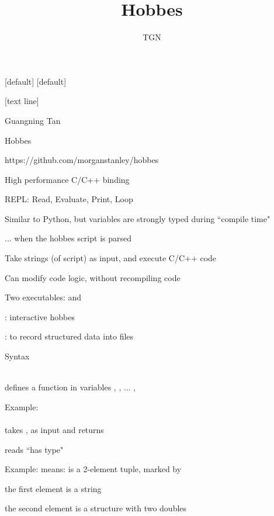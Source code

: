 \documentclass[svgnames,fleqn]{beamer}
\begin{document}
[default]
[default]
\title{Hobbes}
\author{TGN}
\date{}
\frame\titlepage
\setcounter{page}{1}
[text line]{
\parbox{\linewidth}{\hfill {
Guangning Tan
}\hfill{\large\insertpagenumber}
}}

\begin{frame}{Hobbes}

https://github.com/morganstanley/hobbes

\bi
\item High performance C/C++ binding
\item REPL: Read, Evaluate, Print, Loop
\item Similar to Python, but variables are strongly typed during ``compile time"
\bi
\item ... when the hobbes script is parsed
\ei
\item Take strings (of script) as input, and execute C/C++ code
\item Can modify code logic, without recompiling code
\ei

\end{frame}

\begin{frame}{Two executables:  and }
\bi
\item {}: interactive hobbes
\item {}: to record structured data into files
\ei
\end{frame}

\begin{frame}{Syntax}
\bi
\item {} \\
defines a function  in variables , , ... , 
\bi
\item Example:\\
\\
takes ,  as input and returns 
\ei
\item \li{::} reads ``has type"
\bi
\item Example:
means:  is a 2-element tuple, marked by \li{*}
\bi
\item the first element is a string
\item the second element is a structure with two doubles
\ei
\ei
\ei

\end{frame}
\end{document}
